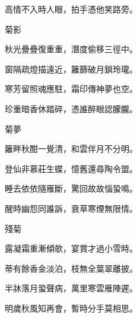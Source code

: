 \begin{poem}
    \begin{pl}高情不入時人眼，拍手憑他笑路旁。\end{pl}
    \emptypl

    \begin{pl}菊影　\end{pl}

    \begin{pl}秋光疊疊復重重，潛度偷移三徑中。\end{pl}

    \begin{pl}窗隔疏燈描遠近，籬篩破月鎖玲瓏。\end{pl}

    \begin{pl}寒芳留照魂應駐，霜印傳神夢也空。\end{pl}

    \begin{pl}珍重暗香休踏碎，憑誰醉眼認朦朧。\end{pl}
    \emptypl

    \begin{pl}菊夢　\end{pl}

    \begin{pl}籬畔秋酣一覺清，和雲伴月不分明。\end{pl}

    \begin{pl}登仙非慕莊生蝶，憶舊還尋陶令盟。\end{pl}

    \begin{pl}睡去依依隨雁斷，驚回故故惱蛩鳴。\end{pl}

    \begin{pl}醒時幽怨同誰訴，衰草寒煙無限情。\end{pl}
    \emptypl

    \begin{pl}殘菊　\end{pl}

    \begin{pl}露凝霜重漸傾欹，宴賞才過小雪時。\end{pl}

    \begin{pl}蒂有餘香金淡泊，枝無全葉翠離披。\end{pl}

    \begin{pl}半牀落月蛩聲病，萬里寒雲雁陣遲。\end{pl}

    \begin{pl}明歲秋風知再會，暫時分手莫相思。\end{pl}
\end{poem}



